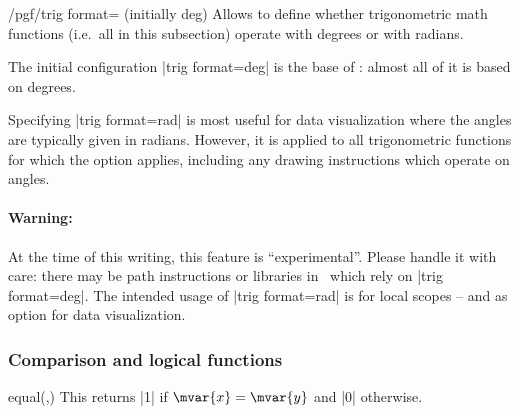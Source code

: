 \begin{key}{/pgf/trig format= (initially deg)}
    Allows to define whether trigonometric math functions (i.e.\ all in this
    subsection) operate with degrees or with radians.
\begin{codeexample}[]
 \pgfmathresult
\end{codeexample}
\begin{codeexample}[]
 \pgfmathresult
\end{codeexample}

    The initial configuration |trig format=deg| is the base of \pgfname: almost
    all of it is based on degrees.

    Specifying |trig format=rad| is most useful for data visualization where
    the angles are typically given in radians. However, it is applied to all
    trigonometric functions for which the option applies, including any drawing
    instructions which operate on angles.
\begin{codeexample}[]
\end{codeexample}

    \paragraph{Warning:}
    At the time of this writing, this feature is ``experimental''. Please
    handle it with care: there may be path instructions or libraries in
    \pgfname\ which rely on |trig format=deg|. The intended usage of
    |trig format=rad| is for local scopes -- and as option for data
    visualization.
\end{key}


\subsubsection{Comparison and logical functions}
\label{pgfmath-functions-comparison}

\begin{math-function}{equal(,)}
\mathcommand
    This returns |1| if $\mvar{x}=\mvar{y}$ and |0| otherwise.
\begin{codeexample}[]
 \pgfmathresult
\end{codeexample}
\end{math-function}

